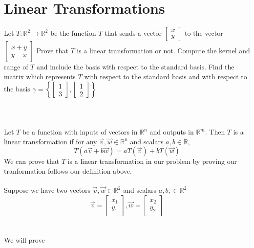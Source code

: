 \documentclass[12pt]{article}
\begin{document}
\section{Linear Transformations}
Let  $T: \mathbb{R}^2 \rightarrow \mathbb{R}^2$ be the function $T$ that sends a vector $\begin{bmatrix}x\\ y \end{bmatrix}$ to the vector $\begin{bmatrix}x+y\\ y-x \end{bmatrix}$ Prove that $T$ is a linear transformation or not. Compute the kernel and range of $T$ and include the basis with respect to the standard basis. Find the matrix which represents $T$ with respect to the standard basis and with respect to the basis $\gamma =\left\{\begin{bmatrix} 1 \\ 3\end{bmatrix},\begin{bmatrix} 1 \\ 2\end{bmatrix} \right\} $
\\\\ 
\\\\Let $T$ be a function with inputs of vectors in $\mathbb{R}^n$ and outputs in $\mathbb{R}^m$. Then $T$ is a linear transformation if for any $\vec{v}, \vec{w} \in  \mathbb{R}^n$ and scalars $a,b \in \mathbb{R},$
\begin{equation*}
T(a\vec{v}+b\vec{w}) = aT(\vec{v}) + bT(\vec{w})
\end{equation*}
We can prove that $T$ is a linear transformation in our problem by proving our tranformation follows our definition above.
\\\\ Suppose we have two vectors $\vec{v}, \vec{w} \in \mathbb{R}^2$ and scalars $a, b, \in \mathbb{R}^2$
\begin{equation*}\vec{v} = \begin{bmatrix}x_1 \\ y_1\end{bmatrix},
\vec{w} = \begin{bmatrix}x_2 \\ y_2\end{bmatrix} \end{equation*}
\\\\ We will prove
\end{document}
